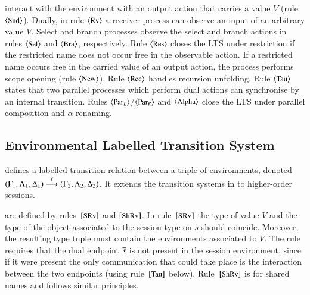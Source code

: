 interact with the environment with an output action that carries a value
$V$ (rule~$\ltsrule{Snd}$).  Dually, in rule $\ltsrule{Rv}$ a
receiver process can observe an input of an arbitrary value $V$.
Select and branch processes observe the select and branch
actions in rules $\ltsrule{Sel}$ and $\ltsrule{Bra}$, respectively.
Rule $\ltsrule{Res}$ closes the LTS under restriction 
if the restricted name does not occur free in the
observable action. 
If a restricted name occurs free in
the carried value of an output action,
the process performs scope opening (rule $\ltsrule{New}$).  
Rule $\ltsrule{Rec}$ handles recursion unfolding.
Rule $\ltsrule{Tau}$ 
states that two parallel processes which perform
dual actions can synchronise by an internal transition.
Rules $\ltsrule{Par${}_L$}$/$\ltsrule{Par${}_R$}$ 
and $\ltsrule{Alpha}$ close the LTS
under parallel composition and $\alpha$-renaming. 

\subsection{Environmental Labelled Transition System}
\label{ss:elts}
\noi 
{}
defines a labelled transition relation between 
a triple of environments, 
denoted
$(\Gamma_1, \Lambda_1, \Delta_1) \stackrel{\ell}{\longrightarrow} (\Gamma_2, \Lambda_2, \Delta_2)$.
It extends the transition systems
in \cite{KYHH2015,KY2015} 
to higher-order sessions. 

are defined by 
rules~$\eltsrule{SRv}$ and $\eltsrule{ShRv}$.
In rule~$\eltsrule{SRv}$
the type of value $V$
and the type of the object associated to the session type on $s$ 
should coincide. 
Moreover, 
the resulting type tuple must contain the environments 
associated to $V$. 
The %
rule requires that 
the dual endpoint $\overline{s}$ is not 
present in the session environment, since if it were present
the only communication that could take place is the interaction
between the two endpoints (using rule~$\eltsrule{Tau}$ below).
Rule~$\eltsrule{ShRv}$ is for shared names and follows similar principles.

